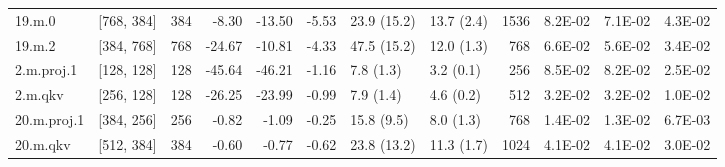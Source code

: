 \begin{table}
\begin{tabular}{llrrrrllrrrr}
19.m.0 & [768, 384] & 384 & {\cellcolor[HTML]{FFFDBC}} \color[HTML]{000000} -8.30 & {\cellcolor[HTML]{FFF2AA}} \color[HTML]{000000} -13.50 & {\cellcolor[HTML]{F8FCB6}} \color[HTML]{000000} -5.53 & 23.9 (15.2) & 13.7 (2.4) & 1536 & {\cellcolor[HTML]{FEE491}} \color[HTML]{000000} 8.2E-02 & {\cellcolor[HTML]{FEEFA3}} \color[HTML]{000000} 7.1E-02 & {\cellcolor[HTML]{EEF8A8}} \color[HTML]{000000} 4.3E-02 \\
19.m.2 & [384, 768] & 768 & {\cellcolor[HTML]{FED481}} \color[HTML]{000000} -24.67 & {\cellcolor[HTML]{FFF8B4}} \color[HTML]{000000} -10.81 & {\cellcolor[HTML]{F5FBB2}} \color[HTML]{000000} -4.33 & 47.5 (15.2) & 12.0 (1.3) & 768 & {\cellcolor[HTML]{FFF3AC}} \color[HTML]{000000} 6.6E-02 & {\cellcolor[HTML]{FFFEBE}} \color[HTML]{000000} 5.6E-02 & {\cellcolor[HTML]{E3F399}} \color[HTML]{000000} 3.4E-02 \\
2.m.proj.1 & [128, 128] & 128 & {\cellcolor[HTML]{F67C4A}} \color[HTML]{F1F1F1} -45.64 & {\cellcolor[HTML]{F67A49}} \color[HTML]{F1F1F1} -46.21 & {\cellcolor[HTML]{ECF7A6}} \color[HTML]{000000} -1.16 & 7.8 (1.3) & 3.2 (0.1) & 256 & {\cellcolor[HTML]{FEE08B}} \color[HTML]{000000} 8.5E-02 & {\cellcolor[HTML]{FEE28F}} \color[HTML]{000000} 8.2E-02 & {\cellcolor[HTML]{D7EE8A}} \color[HTML]{000000} 2.5E-02 \\
2.m.qkv & [256, 128] & 128 & {\cellcolor[HTML]{FECE7C}} \color[HTML]{000000} -26.25 & {\cellcolor[HTML]{FED683}} \color[HTML]{000000} -23.99 & {\cellcolor[HTML]{ECF7A6}} \color[HTML]{000000} -0.99 & 7.9 (1.4) & 4.6 (0.2) & 512 & {\cellcolor[HTML]{E0F295}} \color[HTML]{000000} 3.2E-02 & {\cellcolor[HTML]{E0F295}} \color[HTML]{000000} 3.2E-02 & {\cellcolor[HTML]{BDE379}} \color[HTML]{000000} 1.0E-02 \\
20.m.proj.1 & [384, 256] & 256 & {\cellcolor[HTML]{ECF7A6}} \color[HTML]{000000} -0.82 & {\cellcolor[HTML]{ECF7A6}} \color[HTML]{000000} -1.09 & {\cellcolor[HTML]{EBF7A3}} \color[HTML]{000000} -0.25 & 15.8 (9.5) & 8.0 (1.3) & 768 & {\cellcolor[HTML]{C3E67D}} \color[HTML]{000000} 1.4E-02 & {\cellcolor[HTML]{C3E67D}} \color[HTML]{000000} 1.3E-02 & {\cellcolor[HTML]{B7E075}} \color[HTML]{000000} 6.7E-03 \\
20.m.qkv & [512, 384] & 384 & {\cellcolor[HTML]{EBF7A3}} \color[HTML]{000000} -0.60 & {\cellcolor[HTML]{ECF7A6}} \color[HTML]{000000} -0.77 & {\cellcolor[HTML]{EBF7A3}} \color[HTML]{000000} -0.62 & 23.8 (13.2) & 11.3 (1.7) & 1024 & {\cellcolor[HTML]{ECF7A6}} \color[HTML]{000000} 4.1E-02 & {\cellcolor[HTML]{ECF7A6}} \color[HTML]{000000} 4.1E-02 & {\cellcolor[HTML]{DDF191}} \color[HTML]{000000} 3.0E-02 \\

\end{tabular}
\end{table}
